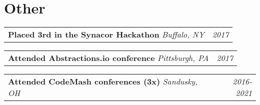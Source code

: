 \documentclass[letterpaper,11pt]{article}
\makeatletter
\newenvironment{other}[3]
{
  \begin{tabular*}{\textwidth}{l@{\extracolsep{\fill}}r}
    \large{\textbf{#1}} \textit{#2} & \textit{#3}
  \end{tabular*}
}
\makeatother
\begin{document}
\section{Other}
\begin{other}{Placed 3rd in the Synacor Hackathon} {Buffalo, NY}    {2017}\end{other}
\begin{other}{Attended Abstractions.io conference} {Pittsburgh, PA} {2017}\end{other}
\begin{other}{Attended CodeMash conferences (3x)}  {Sandusky, OH}   {2016-2021}\end{other}
\end{document}
